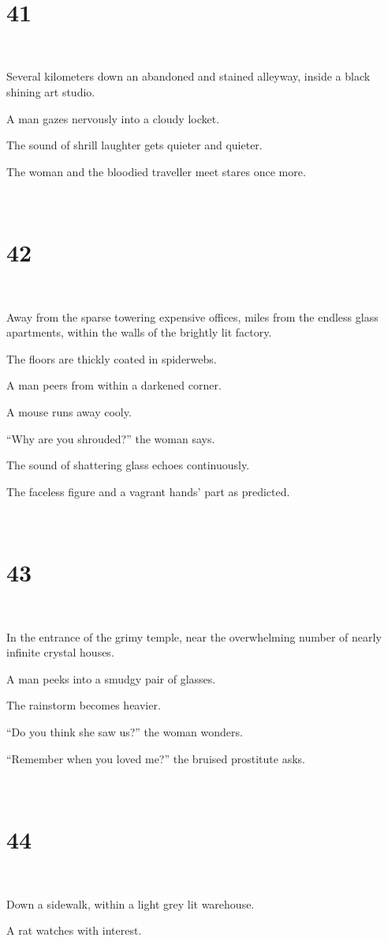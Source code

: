 \documentclass{report}
\begin{document}
~
\chapter*{41}
~

Several kilometers down an abandoned and stained alleyway, inside a black shining art studio.

A man gazes nervously into a cloudy locket.

The sound of shrill laughter gets quieter and quieter.

The woman and the bloodied traveller meet stares once more.

~
\chapter*{42}
~

Away from the sparse towering expensive offices, miles from the endless glass apartments, within the walls of the brightly lit factory.

The floors are thickly coated in spiderwebs.

A man peers from within a darkened corner.

A mouse runs away cooly.

``Why are you shrouded?'' the woman says.

The sound of shattering glass echoes continuously.

The faceless figure and a vagrant hands' part as predicted.

~
\chapter*{43}
~

In the entrance of the grimy temple, near the overwhelming number of nearly infinite crystal houses.

A man peeks into a smudgy pair of glasses.

The rainstorm becomes heavier.

``Do you think she saw us?'' the woman wonders.

``Remember when you loved me?'' the bruised prostitute asks.

~
\chapter*{44}
~

Down a sidewalk, within a light grey lit warehouse.

A rat watches with interest.
\end{document}

